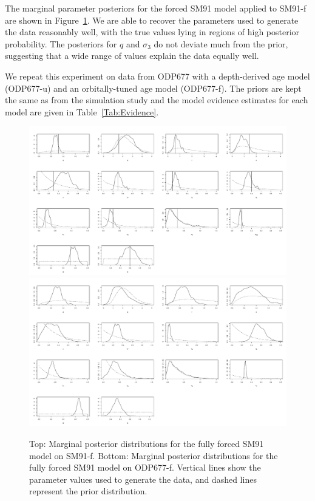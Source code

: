 \documentclass[a4paper,12pt]{article}
\begin{document}
The marginal parameter posteriors for the forced SM91 model applied to SM91-f are shown in Figure~\ref{Fig:Posterior}.
We are able to recover the parameters used to generate the data reasonably well, with the true values lying in regions of high posterior probability.
The posteriors for $q$ and $\sigma_3$ do not deviate much from the prior, suggesting that a wide range of values explain the data equally well.

We repeat this experiment on data from ODP677 with a depth-derived age model \cite{Huybers2007} (ODP677-u) and an orbitally-tuned age model \cite{Lisiecki2005} (ODP677-f).
The priors are kept the same as from the simulation study and the model evidence estimates for each model are given in Table~\ref{Tab:Evidence}.

\begin{figure}[p]
\centering
\includegraphics[width=\textwidth]{MSSSPE.pdf}\\\vspace{24pt}
\includegraphics[width=\textwidth]{LR04677SM91.pdf}
\caption{Top: Marginal posterior distributions for the fully forced SM91 model on SM91-f.
Bottom: Marginal posterior distributions for the fully forced SM91 model on ODP677-f.
Vertical lines show the parameter values used to generate the data, and dashed lines represent the prior distribution.}
\label{Fig:Posterior}
\end{figure}
\end{document}
